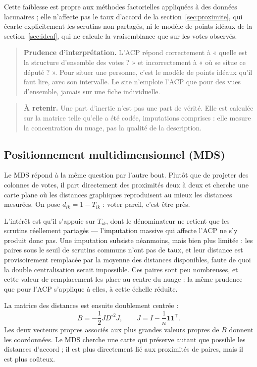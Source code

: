 \documentclass[11pt,a4paper]{article}
\newcommand{\important}[1]{\begin{quote}\small\color{blue!55!black}\textbf{À retenir.} #1\end{quote}}
\newcommand{\prudence}[1]{\begin{quote}\small\color{red!55!black}\textbf{Prudence d'interprétation.} #1\end{quote}}
\begin{document}
Cette faiblesse est propre aux méthodes factorielles appliquées à des données
lacunaires ; elle n'affecte pas le taux d'accord de la
section~\ref{sec:proximite}, qui écarte explicitement les scrutins non partagés,
ni le modèle de points idéaux de la section~\ref{sec:ideal}, qui ne calcule la
vraisemblance que sur les votes observés.

\prudence{L'ACP répond correctement à « quelle est la structure d'ensemble des
votes ? » et incorrectement à « où se situe ce député ? ». Pour situer une
personne, c'est le modèle de points idéaux qu'il faut lire, avec son intervalle.
Le site n'emploie l'ACP que pour des vues d'ensemble, jamais sur une fiche
individuelle.}

\important{Une part d'inertie n'est pas une part de vérité. Elle est calculée
sur la matrice telle qu'elle a été codée, imputations comprises : elle mesure
la concentration du nuage, pas la qualité de la description.}

\subsection{Positionnement multidimensionnel (MDS)}

Le MDS répond à la même question par l'autre bout. Plutôt que de projeter des
colonnes de votes, il part directement des proximités deux à deux et cherche
une carte plane où les distances graphiques reproduisent au mieux les distances
mesurées. On pose $d_{ik}=1-T_{ik}$ : voter pareil, c'est être près.

L'intérêt est qu'il s'appuie sur $T_{ik}$, dont le dénominateur ne retient que
les scrutins réellement partagés — l'imputation massive qui affecte l'ACP ne
s'y produit donc pas. Une imputation subsiste néanmoins, mais bien plus
limitée : les paires sous le seuil de scrutins communs n'ont pas de taux, et
leur distance est provisoirement remplacée par la moyenne des distances
disponibles, faute de quoi la double centralisation serait impossible. Ces
paires sont peu nombreuses, et cette valeur de remplacement les place au centre
du nuage : la même prudence que pour l'ACP s'applique à elles, à cette échelle
réduite.

La matrice des distances est ensuite doublement centrée :
\[
 B=-\frac12 JD^{\circ2}J,\qquad
 J=I-\frac1n\mathbf{1}\mathbf{1}^{\mathsf T}.
\]
Les deux vecteurs propres associés aux plus grandes valeurs propres de $B$
donnent les coordonnées. Le MDS cherche une carte qui préserve autant que
possible les distances d'accord ; il est plus directement lié aux proximités
de paires, mais il est plus coûteux.
\end{document}
